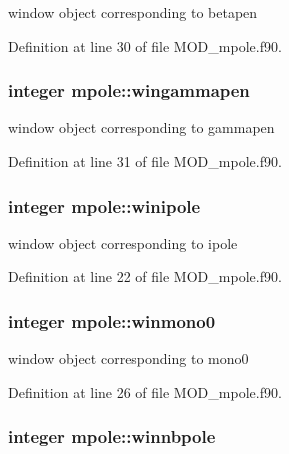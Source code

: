 window object corresponding to betapen 



Definition at line 30 of file M\-O\-D\-\_\-mpole.\-f90.

\hypertarget{classmpole_a13089e182e3859dc141ef2d18574c565}{
\subsubsection[{wingammapen}]{\setlength{\rightskip}{0pt plus 5cm}integer mpole\-::wingammapen}}\label{classmpole_a13089e182e3859dc141ef2d18574c565}


window object corresponding to gammapen 



Definition at line 31 of file M\-O\-D\-\_\-mpole.\-f90.

\hypertarget{classmpole_a0603a7e979963e0aa76806b59dc99034}{
\subsubsection[{winipole}]{\setlength{\rightskip}{0pt plus 5cm}integer mpole\-::winipole}}\label{classmpole_a0603a7e979963e0aa76806b59dc99034}


window object corresponding to ipole 



Definition at line 22 of file M\-O\-D\-\_\-mpole.\-f90.

\hypertarget{classmpole_ad85303f58e12c2fccac8d9f029e0425b}{
\subsubsection[{winmono0}]{\setlength{\rightskip}{0pt plus 5cm}integer mpole\-::winmono0}}\label{classmpole_ad85303f58e12c2fccac8d9f029e0425b}


window object corresponding to mono0 



Definition at line 26 of file M\-O\-D\-\_\-mpole.\-f90.

\hypertarget{classmpole_acf42619768b96f86ff59c29e25bce1f3}{
\subsubsection[{winnbpole}]{\setlength{\rightskip}{0pt plus 5cm}integer mpole\-::winnbpole}}\label{classmpole_acf42619768b96f86ff59c29e25bce1f3}


